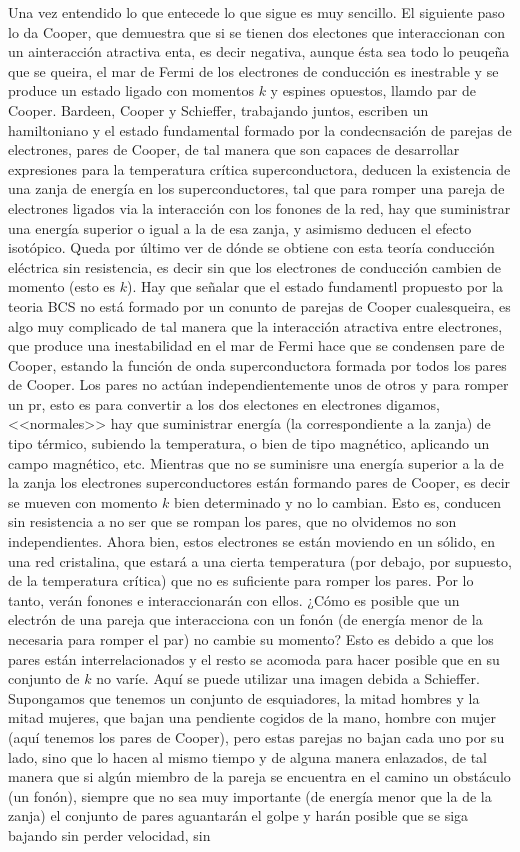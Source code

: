 Una vez entendido lo que entecede lo que sigue es muy sencillo. El siguiente paso lo da Cooper, que demuestra que si se tienen dos electones que interaccionan con un ainteracción atractiva enta, es decir negativa, aunque ésta sea todo lo peuqeña que se queira, el mar de Fermi de los electrones de conducción es inestrable y se produce un estado ligado con momentos $k$ y espines opuestos, llamdo par de Cooper. Bardeen, Cooper y Schieffer, trabajando juntos, escriben un hamiltoniano y el estado fundamental formado por la condecnsación de parejas de electrones, pares de Cooper, de tal manera que son capaces de desarrollar expresiones para la temperatura crítica superconductora, deducen la existencia de una zanja de energía en los superconductores, tal que para romper una pareja de electrones ligados via la interacción con los fonones de la red, hay que suministrar una energía superior o igual a la de esa zanja, y asimismo deducen el efecto isotópico. Queda por último ver de dónde se obtiene con esta teoría conducción eléctrica sin resistencia, es decir sin que los electrones de conducción cambien de momento (esto es $k$). Hay que señalar que el estado fundamentl propuesto por la teoria BCS no está formado por un conunto de parejas de Cooper cualesqueira, es algo muy complicado de tal manera que la interacción atractiva entre electrones, que produce una inestabilidad en el mar de Fermi hace que se condensen pare de Cooper, estando la función de onda superconductora formada por todos los pares de Cooper. Los pares no actúan independientemente unos de otros y para romper un pr, esto es para convertir a los dos electones en electrones digamos, <<normales>> hay que suministrar energía (la correspondiente a la zanja) de tipo térmico, subiendo la temperatura, o bien de tipo magnético, aplicando un campo magnético, etc. Mientras que no se suminisre una energía superior a la de la zanja los electrones superconductores están formando pares de Cooper, es decir se mueven con momento $k$ bien determinado y no lo cambian. Esto es, conducen sin resistencia a no ser que se rompan los pares, que no olvidemos no son independientes. Ahora bien, estos electrones se están moviendo en un sólido, en una red cristalina, que estará a una cierta temperatura (por debajo, por supuesto, de la temperatura crítica) que no es suficiente para romper los pares. Por lo tanto, verán fonones e interaccionarán con ellos. ¿Cómo es posible que un electrón de una pareja que interacciona con un fonón (de energía menor de la necesaria para romper el par) no cambie su momento? Esto es debido a que los pares están interrelacionados y el resto se acomoda para hacer posible que en su conjunto de $k$ no varíe. Aquí se puede utilizar una imagen debida a Schieffer. Supongamos que tenemos un conjunto de esquiadores, la mitad hombres y la mitad mujeres, que bajan una pendiente cogidos de la mano, hombre con mujer (aquí tenemos los pares de Cooper), pero estas parejas no bajan cada uno por su lado, sino que lo hacen al mismo tiempo y de alguna manera enlazados, de tal manera que si algún miembro de la pareja se encuentra en el camino un obstáculo (un fonón), siempre que no sea muy importante (de energía menor que la de la zanja) el conjunto de pares aguantarán el golpe y harán posible que se siga bajando sin perder velocidad, sin 